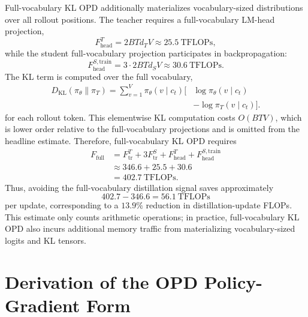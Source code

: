 Full-vocabulary KL OPD additionally materializes vocabulary-sized distributions over all rollout positions. The teacher requires a full-vocabulary LM-head projection,
\[
F_{\mathrm{head}}^{T}
=
2BTd_TV
\approx
25.5\ \mathrm{TFLOPs},
\]
while the student full-vocabulary projection participates in backpropagation:
\[
F_{\mathrm{head}}^{S,\mathrm{train}}
=
3\cdot 2BTd_SV
\approx
30.6\ \mathrm{TFLOPs}.
\]
The KL term is computed over the full vocabulary,
\[
\begin{aligned}
D_{\mathrm{KL}}(\pi_\theta \| \pi_T)
=
\sum_{v=1}^{V}
\pi_\theta(v\mid c_t)
\Big[
&\log \pi_\theta(v\mid c_t) \\
&-\log \pi_T(v\mid c_t)
\Big].
\end{aligned}
\]
for each rollout token. This elementwise KL computation costs \(O(BTV)\), which is lower order relative to the full-vocabulary projections and is omitted from the headline estimate. Therefore, full-vocabulary KL OPD requires
\[
\begin{aligned}
F_{\mathrm{full}}
&= F_{\mathrm{tr}}^{T}
+ 3F_{\mathrm{tr}}^{S}
+ F_{\mathrm{head}}^{T}
+ F_{\mathrm{head}}^{S,\mathrm{train}} \\
&\approx 346.6 + 25.5 + 30.6 \\
&= 402.7\ \mathrm{TFLOPs}.
\end{aligned}
\]
Thus, avoiding the full-vocabulary distillation signal saves approximately
\[
402.7 - 346.6 = 56.1\ \mathrm{TFLOPs}
\]
per update, corresponding to a \(13.9\%\) reduction in distillation-update FLOPs. This estimate only counts arithmetic operations; in practice, full-vocabulary KL OPD also incurs additional memory traffic from materializing vocabulary-sized logits and KL tensors.


\section{Derivation of the OPD Policy-Gradient Form}
\label{app:opd-pg-derivation}

